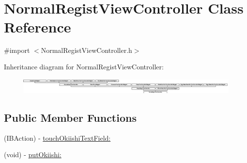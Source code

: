\hypertarget{interface_normal_regist_view_controller}{
\section{NormalRegistViewController Class Reference}
\label{interface_normal_regist_view_controller}
}


{\ttfamily \#import $<$NormalRegistViewController.h$>$}

Inheritance diagram for NormalRegistViewController:\begin{figure}[H]
\begin{center}
\leavevmode
\includegraphics[height=0.870241cm]{interface_normal_regist_view_controller}
\end{center}
\end{figure}
\subsection*{Public Member Functions}
\begin{DoxyCompactItemize}
\item 
(IBAction) -\/ \hyperlink{interface_normal_regist_view_controller_a5198c354bf444fb83aefaa35d552f2d3}{touchOkiishiTextField:}
\item 
(void) -\/ \hyperlink{interface_normal_regist_view_controller_a204217b06efdc4f399ece1d346522c23}{putOkiishi:}
\end{DoxyCompactItemize}
